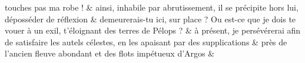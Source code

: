 \documentclass[12pt,onecolumn,twoside,a4paper]{memoir}
\begin{document}
\begin{pairs}
\begin{Rightside}
                              touches pas ma robe ! \&
                         \stanza 
                      ainsi, inhabile par abrutissement, il se précipite hors lui,
                              déposséder de réflexion  \&
                         \stanza 
                      demeurerais-tu ici, sur place ? Ou est-ce que je dois te vouer à un
                              exil, t’éloignant des terres de Pélops ?  \&
                         \stanza 
                      à présent, je persévérerai afin de satisfaire les autels célestes, en
                              les apaisant par des supplications \&
                         \stanza 
                      près de l’ancien fleuve abondant et des flots impétueux d’Argos \&
                     
                  \endnumbering
		\end{Rightside}
               \end{pairs}
	\Columns
            
            
\end{document}
